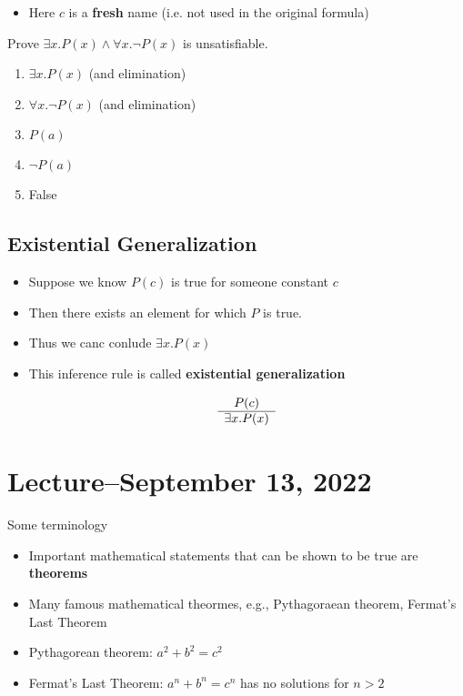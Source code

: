 \documentclass[8pt]{scrreprt}
\begin{document}
\begin{landscape}
\begin{multicols*}{3}
\begin{itemize}
	\item Here $c$ is a \textbf{fresh} name (i.e. not used in the original formula)
\end{itemize}

\begin{example}
	Prove $\exists x. P(x)\land \forall x.\neg P(x)$ is unsatisfiable.

	\begin{enumerate}
		\item $\exists x.P(x)$ (and elimination)
		\item $\forall x. \neg P(x)$ (and elimination)
		\item $P(a)$
		\item $\neg P(a)$
		\item False
	\end{enumerate}
\end{example}

\subsection{Existential Generalization}
\begin{itemize}
	\item Suppose we know $P(c)$ is true for someone constant $c$
	\item Then there exists an element for which $P$ is true.
	\item Thus we canc conlude $\exists x. P(x)$
	\item This inference rule is called \textbf{existential generalization}

	      \[
		      \begin{array}[]{c}
			      P(c) \\
			      \hline
			      \exists x. P(x)
		      \end{array}
	      \]
\end{itemize}

\section{Lecture--September 13, 2022}

Some terminology

\begin{itemize}
	\item Important mathematical statements that can be shown to be true are \textbf{theorems}
	\item Many famous mathematical theormes, e.g., Pythagoraean theorem, Fermat's Last Theorem
	\item Pythagorean theorem: $a^2 + b^2 = c^2$
	\item Fermat's Last Theorem: $a^n + b^n = c^n$ has no solutions for $n > 2$
\end{itemize}


\end{multicols*}
\end{landscape}
\end{document}
